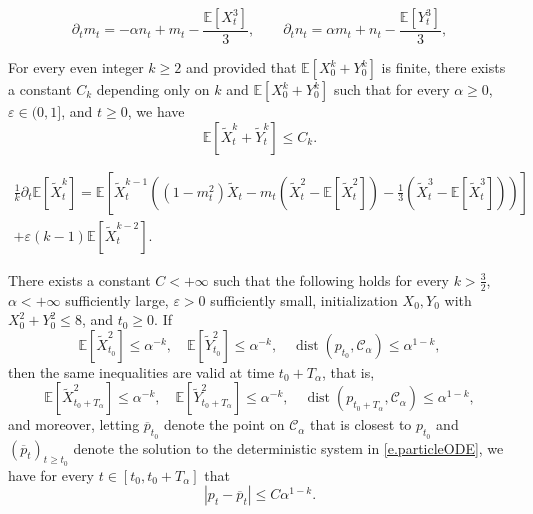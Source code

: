 \documentclass[10pt,a4paper]{amsart}
\DeclareMathOperator{\dist}{dist}
\newcommand{\E}{\mathbb E}
\newcommand{\Ll}{\left}
\newcommand{\Rr}{\right}
\newcommand{\al}{\alpha}
\newcommand{\dr}{\partial}
\newcommand{\eps}{\varepsilon}
\newcommand{\ep}{\varepsilon}
\newcommand{\msc}{\mathscr}
\newcommand{\td}{\widetilde}
\renewcommand{\bar}{\overline}
\renewcommand{\ge}{\geqslant}
\renewcommand{\le}{\leqslant}
\begin{document}
\begin{equation}  
\label{e.ev.mn}
\dr_t m_t = -\alpha n_t + m_t - \frac{\E[X_t^3]}{3}, \qquad \dr_t n_t = \alpha m_t + n_t - \frac{\E[Y_t^3]}{3},
\end{equation}

\begin{proposition}
\label{p.moment.bounds} 
For every even integer $k \ge 2$ and provided that $\E[X_0^k + Y_0^k]$ is finite, there exists a constant $C_k$ depending only on $k$ and $\E[X_0^k + Y_0^k]$ such that for every $\al \ge 0$, $\ep \in (0,1]$, and $t \ge 0$, we have
\begin{equation*}  %
\E[\td X_t^k + \td Y_t^k] \le C_k.
\end{equation*}
\end{proposition}

\begin{multline}  
\label{e.ito.pmoment}
\frac 1 k \dr_t \E[\td X_t^k] 
 = \E \Ll[\td X_t^{k-1}\Ll( (1-m_t^2) \td X_t -m_t \Ll(\td X_t^2 - \E[\td X_t^2] \Rr)
 - \frac 1 3 \Ll( \td X_t^3 - \E[\td X_t^3] \Rr)\Rr) \Rr] 
 \\ 
 + \ep (k-1) \E[\td X_t^{k-2}].
\end{multline}

\begin{theorem}[Induction]
\label{t.bootstrap}
There exists a constant $C < +\infty$ such that the following holds for every $k  > \frac 3 2$, $\alpha < +\infty$ sufficiently large, $\eps > 0$ sufficiently small, initialization $X_0, Y_0$ with $X_0^2 + Y_0^2 \le 8$, and $t_0 \ge 0$. If
\begin{equation}  
\label{e.bootstrap.ass}
\E[\td X_{t_0}^2]\le \al^{-k}, \quad \E[\td Y_{t_0}^2]\le \al^{-k}, \quad \dist(p_{t_0}, \msc C_\al) \le  \alpha^{1 - k},
\end{equation}
then the same inequalities are valid at time $t_0 + T_\al$, that is,
\begin{equation}  
\label{e.bootstrap.ccl}
\E[\td X_{t_0+T_\al}^2]\le \al^{-k}, \quad \E[\td Y_{t_0+T_\al}^2]\le \al^{-k}, \quad \dist(p_{t_0+T_\al}, \msc C_\al) \le \alpha^{1 - k},
\end{equation}
and moreover, letting $\bar p_{t_0}$ denote the point on $\msc C_\al$ that is closest to $p_{t_0}$ and $(\bar p_t)_{t \ge t_0}$ denote the solution to the deterministic system in \eqref{e.particleODE}, we have for every $t \in [t_0,t_0+T_\al]$ that
\begin{equation}  
\label{e.bootstrap.cycle}
|p_t - \bar p_t| \le C \al^{1 -k}.
\end{equation}
\end{theorem}
\end{document}
